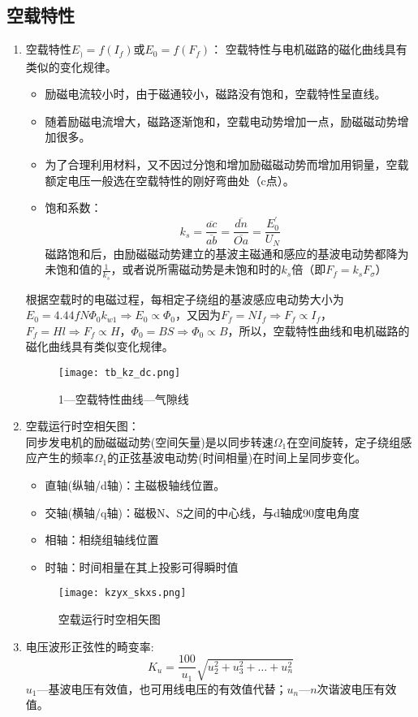 \documentclass[blue]{elegantnote}
\begin{document}
\subsection{空载特性}
\begin{enumerate}
	\item 空载特性$E_)=f(I_f)$或$E_0=f(F_f)$：
	空载特性与电机磁路的磁化曲线具有类似的变化规律。
	\begin{itemize}
		\item 励磁电流较小时，由于磁通较小，磁路没有饱和，空载特性呈直线。
		\item 随着励磁电流增大，磁路逐渐饱和，空载电动势增加一点，励磁磁动势增加很多。
		\item 为了合理利用材料，又不因过分饱和增加励磁磁动势而增加用铜量，空载额定电压一般选在空载特性的刚好弯曲处（c点）。
		\item 饱和系数：$$k_s=\frac{\overline{ac}}{\overline{ab}}=\frac{\overline{dn}}{\overline{Oa}}=\frac{E^{'}_0}{U_N}$$
		磁路饱和后，由励磁磁动势建立的基波主磁通和感应的基波电动势都降为未饱和值的$\frac{1}{k_s}$，或者说所需磁动势是未饱和时的$k_s$倍（即$F_f=k_sF_{\sigma}$）
	\end{itemize}
	\begin{note}
		根据空载时的电磁过程，每相定子绕组的基波感应电动势大小为$E_0=4.44fN\Phi_0k_{w1}\Rightarrow E_0\propto\Phi_0$，又因为$F_f=NI_f\Rightarrow F_f\propto I_f$，$F_f=Hl\Rightarrow F_f\propto H$，$\Phi_0=BS\Rightarrow \Phi_0\propto B$，所以，空载特性曲线和电机磁路的磁化曲线具有类似变化规律。
	\end{note}	
	\begin{figure}[!hbtp]
		\centering
		\texttt{[image: tb\_kz\_dc.png]}
		\caption{1—空载特性曲线—气隙线\label{figur:tb_kz_dc}}
	\end{figure}
	\item 空载运行时空相矢图：\\
	同步发电机的励磁磁动势(空间矢量)是以同步转速$\Omega_1$在空间旋转，定子绕组感应产生的频率$\Omega_1$的正弦基波电动势(时间相量)在时间上呈同步变化。
	\begin{itemize}
		\item 直轴(纵轴/d轴)：主磁极轴线位置。
		\item 交轴(横轴/q轴)：磁极N、S之间的中心线，与d轴成90度{\color{thid}电角度}
		\item 相轴：相绕组轴线位置
		\item 时轴：时间相量在其上投影可得瞬时值
	\end{itemize}
	\begin{figure}[!htp]
		\centering
		\texttt{[image: kzyx\_skxs.png]}
		\caption{空载运行时空相矢图}
	\end{figure}
	\item 电压波形正弦性的畸变率:
	$$K_u=\frac{100}{u_1}\sqrt{u_2^{2}+u_3^{2}+\ldots+u_n^{2}}$$
	$u_1$—基波电压有效值，也可用线电压的有效值代替；$u_n$—$n$次谐波电压有效值。
\end{enumerate}
\end{document}
